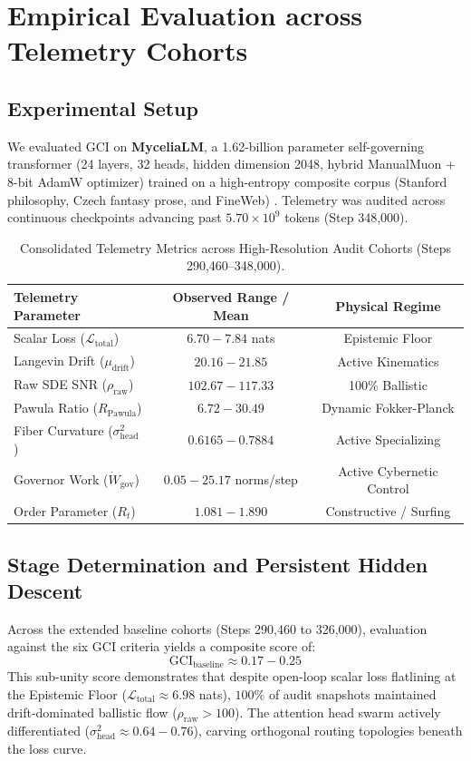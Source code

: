 \documentclass[11pt,twocolumn]{article}
\begin{document}
\section{Empirical Evaluation across Telemetry Cohorts}

\subsection{Experimental Setup}
We evaluated GCI on \textbf{MyceliaLM}, a 1.62-billion parameter self-governing transformer (24 layers, 32 heads, hidden dimension 2048, hybrid ManualMuon + 8-bit AdamW optimizer) trained on a high-entropy composite corpus (Stanford philosophy, Czech fantasy prose, and FineWeb) \cite{massif}. Telemetry was audited across continuous checkpoints advancing past $5.70 \times 10^9$ tokens (Step 348,000).

\begin{table}[h]
\centering
\caption{Consolidated Telemetry Metrics across High-Resolution Audit Cohorts (Steps 290,460--348,000).}
\label{tab:gci_telemetry_consolidated}
\small
\begin{tabular}{lcc}
\toprule
\textbf{Telemetry Parameter} & \textbf{Observed Range / Mean} & \textbf{Physical Regime} \\
\midrule
Scalar Loss ($\mathcal{L}_{\text{total}}$) & $6.70 - 7.84$ nats & Epistemic Floor \\
Langevin Drift ($\mu_{\text{drift}}$) & $20.16 - 21.85$ & Active Kinematics \\
Raw SDE SNR ($\rho_{\text{raw}}$) & $102.67 - 117.33$ & 100\% Ballistic \\
Pawula Ratio ($R_{\text{Pawula}}$) & $6.72 - 30.49$ & Dynamic Fokker-Planck \\
Fiber Curvature ($\sigma^2_{\text{head}}$) & $0.6165 - 0.7884$ & Active Specializing \\
Governor Work ($\dot{W}_{\text{gov}}$) & $0.05 - 25.17$ norms/step & Active Cybernetic Control \\
Order Parameter ($R_t$) & $1.081 - 1.890$ & Constructive / Surfing \\
\bottomrule
\end{tabular}
\end{table}

\subsection{Stage Determination and Persistent Hidden Descent}
Across the extended baseline cohorts (Steps 290,460 to 326,000), evaluation against the six GCI criteria yields a composite score of:
\begin{equation}
\text{GCI}_{\text{baseline}} \approx \mathbf{0.17 - 0.25}
\end{equation}
This sub-unity score demonstrates that despite open-loop scalar loss flatlining at the Epistemic Floor ($\mathcal{L}_{\text{total}} \approx 6.98$ nats), $100\%$ of audit snapshots maintained drift-dominated ballistic flow ($\rho_{\text{raw}} > 100$). The attention head swarm actively differentiated ($\sigma^2_{\text{head}} \approx 0.64 - 0.76$), carving orthogonal routing topologies beneath the loss curve.
\end{document}

